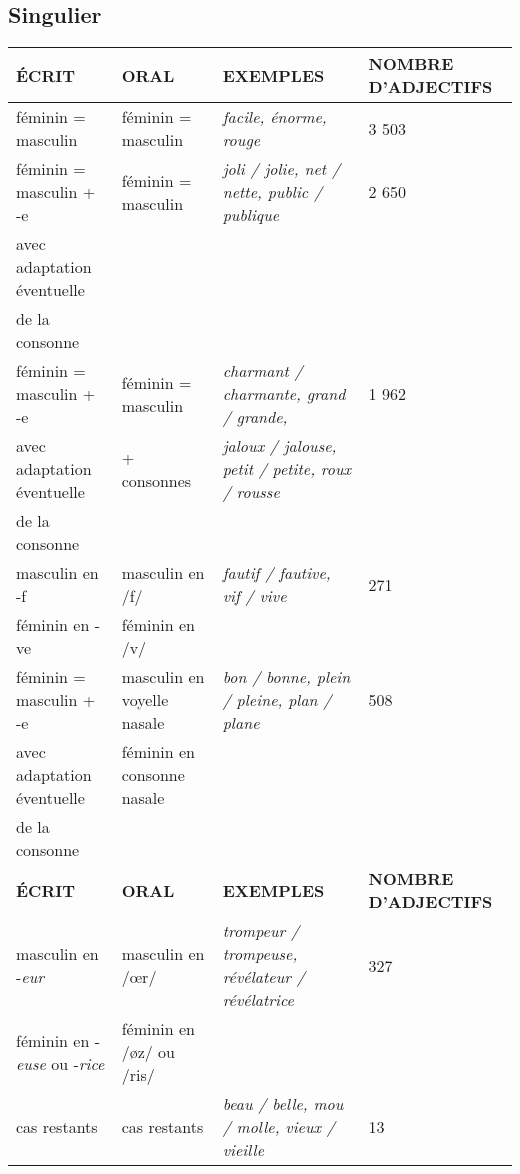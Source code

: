 \documentclass[UTF8]{report}
\begin{document}
\subsection{Singulier}
\begin{table}[H]

\begin{adjustbox}{max width = \textwidth}
        \centering
        \begin{tabular}{|l|l|l|l|}
        \hline
        \rowcolor{cyan!20}
        \textbf{ÉCRIT} & \textbf{ORAL} & \textbf{EXEMPLES} & \textbf{NOMBRE D'ADJECTIFS} \\
        \hline
        féminin = masculin & féminin = masculin & \textit{facile, énorme, rouge} & 3 503 \\
        \hline
        féminin = masculin + -e & féminin = masculin & \textit{joli / jolie, net / nette, public / publique} & 2 650 \\
        avec adaptation éventuelle & & & \\
        de la consonne & & & \\
        \hline
        féminin = masculin + -e & féminin = masculin & \textit{charmant / charmante, grand / grande,} & 1 962 \\
        avec adaptation éventuelle & + consonnes & \textit{jaloux / jalouse, petit / petite, roux / rousse} & \\
        de la consonne & & & \\
        \hline
        masculin en -f & masculin en /f/ & \textit{fautif / fautive, vif / vive} & 271 \\
        féminin en -ve & féminin en /v/ & & \\
        \hline
        féminin = masculin + -e & masculin en voyelle nasale & \textit{bon / bonne, plein / pleine, plan / plane} & 508 \\
        avec adaptation éventuelle & féminin en consonne nasale & & \\
        de la consonne & & & \\
        \hline
        \rowcolor{cyan!20}
        \textbf{ÉCRIT} & \textbf{ORAL} & \textbf{EXEMPLES} & \textbf{NOMBRE D'ADJECTIFS} \\
        \hline
        masculin en -\textit{eur} & masculin en /œr/ & \textit{trompeur / trompeuse, révélateur / révélatrice} & 327 \\
        féminin en -\textit{euse} ou -\textit{rice} & féminin en /øz/ ou /ris/ & & \\
        \hline
        cas restants & cas restants & \textit{beau / belle, mou / molle, vieux / vieille} & 13 \\
        \hline
        \end{tabular}
\end{adjustbox}
\end{table}
\end{document}

